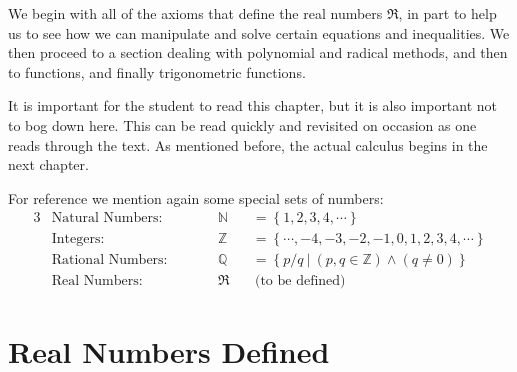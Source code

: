We begin with all of the axioms that define the real numbers
$\Re$, in part to help us to see how we can manipulate and solve
certain equations and inequalities.  We then proceed to a section
dealing with polynomial and radical methods, and then to functions, and
finally trigonometric functions.

It is important for the student to read this chapter, but it is also
important not to bog down here.  This can be read quickly and revisited
on occasion as one reads through the text.  As mentioned before, 
the actual calculus  begins in the next chapter.


For reference we mention again some special sets of numbers:
\begin{alignat}{3}
&\text{Natural Numbers:}&\qquad&{\mathbb N}&&=\left\{1,2,3,4,\cdots\right\}\\
&\text{Integers:}&&
 {\mathbb Z}&&=\left\{\cdots,-4,-3,-2,-1,0,1,2,3,4,\cdots\right\}\\
&\text{Rational Numbers:}&&
 {\mathbb Q}&&=\left\{\left.{p}/{q}\ \right|\ (p,q\in{\mathbb Z})
           \wedge(q\ne0)\right\}\\
&\text{Real Numbers:}&&\Re&&\ \text{(to be defined)}\end{alignat}





\newpage
\section{Real Numbers Defined\label{RealNumbersSection}}
 
